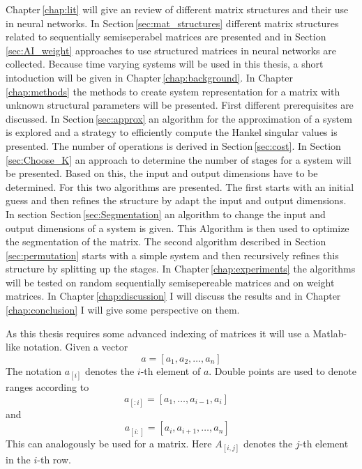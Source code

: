 \documentclass[doctype=mastersthesis,BCOR=15mm,biblatex]{ldvbook}%
\begin{document}
Chapter\,\ref{chap:lit} will give an review of different matrix structures and their use in neural networks.
In Section\,\ref{sec:mat_structures} different matrix structures related to sequentially semiseperabel matrices are presented
and in Section\,\ref{sec:AI_weight} approaches to use structured matrices in neural networks are collected.
Because time varying systems will be used in this thesis, a short intoduction will be given in Chapter\,\ref{chap:background}.
In Chapter\,\ref{chap:methods} the methods to create system representation for a matrix with unknown structural parameters will be presented.
First different prerequisites are discussed.
In Section\,\ref{sec:approx} an algorithm for the approximation of a system is explored
 and a strategy to efficiently compute the Hankel singular values is presented.
The number of operations is derived in Section\,\ref{sec:cost}.
In Section\,\ref{sec:Choose_K} an approach to determine the number of stages for a system will be presented.
Based on this, the input and output dimensions have to be  determined.
For this two algorithms are presented.
The first starts with an initial guess and then refines the structure by adapt the input and output dimensions.
In section Section\,\ref{sec:Segmentation} an algorithm to change the input and output dimensions of a system is given.
This Algorithm is then used to optimize the segmentation of the matrix.
The second algorithm described in Section\,\ref{sec:permutation} starts with a simple system and then recursively refines this structure by splitting up the stages.
In Chapter\,\ref{chap:experiments} the algorithms will be tested on random sequentially semisepereable matrices and on weight matrices.
In Chapter\,\ref{chap:discussion} I will discuss the results and in Chapter\,\ref{chap:conclusion} I will give some perspective on them.

As this thesis requires some advanced indexing of matrices it will use a Matlab-like notation.
Given a vector 
\begin{equation}
	a = [a_1, a_2, \dots ,a_n]
\end{equation}
The notation $a_{[i]}$ denotes the $i$-th element of $a$.
Double points are used to denote ranges according to
\begin{equation}
a_{[:i]} = [a_1, \dots ,a_{i-1},a_i]\phantom{a_n}
\end{equation}
and 
\begin{equation}
a_{[i:]} = [a_i, a_{i+1}, \dots ,a_n]\phantom{a_i}
\end{equation}
This can analogously be used for a matrix. Here $A_{[i,j]}$ denotes the $j$-th element in the $i$-th row.
\end{document}
